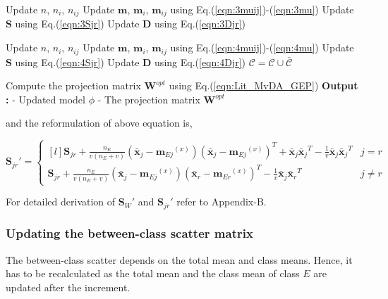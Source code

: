 \begin{algorithm}[t]
\begin{algorithmic}
		\ELSE
		
				\STATE \small Update $n$, $n_i$, $n_{ij}$\;
				\STATE \small Update $\textbf{m}$, $\textbf{m}_i$, $\textbf{m}_{ij}$ using Eq.(\ref{eqn:3muij})-(\ref{eqn:3mu})\;
				\STATE \small Update $\textbf{S}$ using Eq.(\ref{eqn:3Sjr})\;
				\STATE \small Update $\textbf{D}$ using Eq.(\ref{eqn:3Djr})\;

			\ELSE

				\STATE \small Update $n$, $n_i$, $n_{ij}$\;
				\STATE \small Update $\textbf{m}$, $\textbf{m}_i$, $\textbf{m}_{ij}$ using Eq.(\ref{eqn:4muij})-(\ref{eqn:4mu})\;
				\STATE \small Update $\textbf{S}$ using Eq.(\ref{eqn:4Sjr})\;
				\STATE \small Update $\textbf{D}$ using Eq.(\ref{eqn:4Djr})\;
				\STATE $\mathcal{C} = \mathcal{C} \cup \bar{\mathcal{C}}$
			\ENDIF
			
		\ENDIF

		\STATE \small Compute the projection matrix $\textbf{W}^{opt}$ using Eq.(\ref{eqn:Lit_MvDA_GEP})\;
	\ENDWHILE
	\STATE \textbf{Output :}
	\STATE - Updated model $\phi$
	\STATE - The projection matrix $\textbf{W}^{opt}$

\end{algorithmic}
\end{algorithm}

\clearpage

\noindent
and the reformulation of above equation is,

\begin{equation}
\label{eqn:1Sjr}
\textbf{S}_{jr}' = \left\{\begin{matrix*}[l]
\textbf{S}_{jr} + \frac{n_E}{v (n_E+v)} \left ( \bar{\textbf{x}}_j - {\textbf{m}_{Ej}}^{(x)} \right ) \left ( \bar{\textbf{x}}_j - {\textbf{m}_{Ej}}^{(x)} \right )^T + \bar{\textbf{x}}_j {\bar{\textbf{x}}_j}^T - \frac{1}{v} \bar{\textbf{x}}_j {\bar{\textbf{x}}_j}^T & j=r \\[0.3cm] 
\textbf{S}_{jr} + \frac{n_E}{v (n_E+v)} \left ( \bar{\textbf{x}}_j - {\textbf{m}_{Ej}}^{(x)} \right ) \left ( \bar{\textbf{x}}_r - {\textbf{m}_{Er}}^{(x)} \right )^T - \frac{1}{v} \bar{\textbf{x}}_j {\bar{\textbf{x}}_r}^T & j \neq r
\end{matrix*}\right.
\end{equation}

\noindent
For detailed derivation of $\textbf{S}_{W}'$ and $\textbf{S}_{jr}'$ refer to Appendix-B.%




\subsubsection{Updating the between-class scatter matrix}
\label{ssubs:MvIDA_SeqEC_Sb}
The between-class scatter depends on the total mean and class means. Hence, it has to be recalculated as the total mean and the class mean of class $E$ are updated after the increment.


